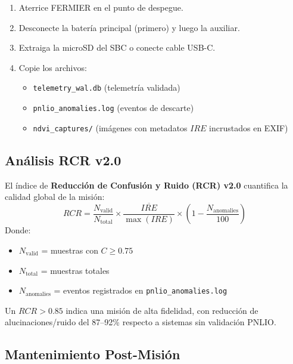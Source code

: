 \begin{enumerate}
    \item Aterrice FERMIER en el punto de despegue.
    \item Desconecte la batería principal (primero) y luego la auxiliar.
    \item Extraiga la microSD del SBC o conecte cable USB-C.
    \item Copie los archivos:
    \begin{itemize}
        \item \texttt{telemetry\_wal.db} (telemetría validada)
        \item \texttt{pnlio\_anomalies.log} (eventos de descarte)
        \item \texttt{ndvi\_captures/} (imágenes con metadatos $IRE$ incrustados en EXIF)
    \end{itemize}
\end{enumerate}

\subsection{Análisis RCR v2.0}

El índice de \textbf{Reducción de Confusión y Ruido (RCR) v2.0} cuantifica la calidad global de la misión:
\begin{equation}
RCR = \frac{N_{\text{valid}}}{N_{\text{total}}} \times \frac{\overline{IRE}}{\max(IRE)} \times \left(1 - \frac{N_{\text{anomalies}}}{100}\right)
\end{equation}
Donde:
\begin{itemize}
    \item $N_{\text{valid}}$ = muestras con $C \geq 0.75$
    \item $N_{\text{total}}$ = muestras totales
    \item $N_{\text{anomalies}}$ = eventos registrados en \texttt{pnlio\_anomalies.log}
\end{itemize}

Un $RCR > 0.85$ indica una misión de alta fidelidad, con reducción de alucinaciones/ruido del 87--92\% respecto a sistemas sin validación PNLIO.

\subsection{Mantenimiento Post-Misión}


